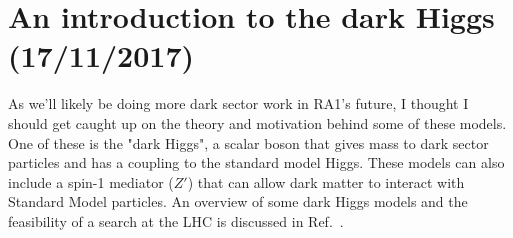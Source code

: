 \newpage
\chapter{An introduction to the dark Higgs (17/11/2017)}

As we'll likely be doing more dark sector work in RA1's future, I thought I should get caught up on the theory and motivation behind some of these models. One of these is the "dark Higgs", a scalar boson that gives mass to dark sector particles and has a coupling to the standard model Higgs. These models can also include a spin-1 mediator ($Z'$) that can allow dark matter to interact with Standard Model particles. An overview of some dark Higgs models and the feasibility of a search at the LHC is discussed in Ref.~\cite{Duerr:2017uap}.